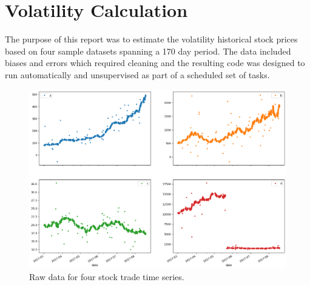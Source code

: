 \documentclass[12pt]{article}
\begin{document}
 

\section{Volatility Calculation}

The purpose of this report was to estimate the volatility historical stock prices based on four sample datasets spanning a 170 day period. The data included biases and errors which required cleaning and the resulting code was designed to run automatically and unsupervised as part of a scheduled set of tasks.

\begin{figure}[ht]
  \centering
  \includegraphics[width=\textwidth]{raw-data.png}
  \caption{Raw data for four stock trade time series.}\label{fig:rawdata}
\end{figure}


\end{document}

